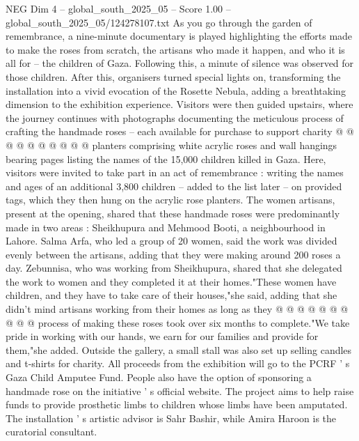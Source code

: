 \begin{textsample}{NEG Dim 4 – global\_south\_2025\_05 – Score 1.00 – global\_south\_2025\_05/124278107.txt}
As you go through the garden of remembrance, a nine-minute documentary is played highlighting the efforts made to make the roses from scratch, the artisans who made it happen, and who it is all for -- the children of Gaza.
Following this, a minute of silence was observed for those children.
After this, organisers turned special lights on, transforming the installation into a vivid evocation of the Rosette Nebula, adding a breathtaking dimension to the exhibition experience.
Visitors were then guided upstairs, where the journey continues with photographs documenting the meticulous process of crafting the handmade roses -- each available for purchase to support charity @ @ @ @ @ @ @ @ @ @ planters comprising white acrylic roses and wall hangings bearing pages listing the names of the 15,000 children killed in Gaza.
Here, visitors were invited to take part in an act of remembrance : writing the names and ages of an additional 3,800 children -- added to the list later -- on provided tags, which they then hung on the acrylic rose planters.
The women artisans, present at the opening, shared that these handmade roses were predominantly made in two areas : Sheikhupura and Mehmood Booti, a neighbourhood in Lahore.
Salma Arfa, who led a group of 20 women, said the work was divided evenly between the artisans, adding that they were making around 200 roses a day.
Zebunnisa, who was working from Sheikhupura, shared that she delegated the work to women and they completed it at their homes."These women have children, and they have to take care of their houses,"she said, adding that she didn't mind artisans working from their homes as long as they @ @ @ @ @ @ @ @ @ @ process of making these roses took over six months to complete."We take pride in working with our hands, we earn for our families and provide for them,"she added.
Outside the gallery, a small stall was also set up selling candles and t-shirts for charity.
All proceeds from the exhibition will go to the PCRF ' s Gaza Child Amputee Fund.
People also have the option of sponsoring a handmade rose on the initiative ' s official website.
The project aims to help raise funds to provide prosthetic limbs to children whose limbs have been amputated.
The installation ' s artistic advisor is Sahr Bashir, while Amira Haroon is the curatorial consultant.

\end{textsample}
